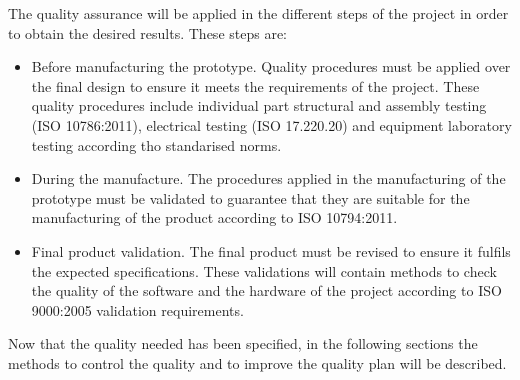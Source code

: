 The quality assurance will be applied in the different steps of the project in order to obtain the desired results. These steps are:
\begin{itemize}
\item  Before manufacturing the prototype. Quality procedures must be applied over the final design to ensure it meets the requirements of the project. These quality procedures include individual part structural  and assembly testing (ISO 10786:2011), electrical testing (ISO 17.220.20) and equipment laboratory testing according tho standarised norms.
\item During the manufacture. The procedures applied in the manufacturing of the prototype must be validated to guarantee that they are suitable for the manufacturing of the product according to ISO 10794:2011.
\item Final product validation. The final product must be revised to ensure it fulfils the expected specifications. These validations will contain methods to check the quality of the software and the hardware of the project according to ISO 9000:2005 validation requirements.
\end{itemize} 
Now that the quality needed has been specified, in the following sections the methods to control the quality and to improve the quality plan will be described. 
